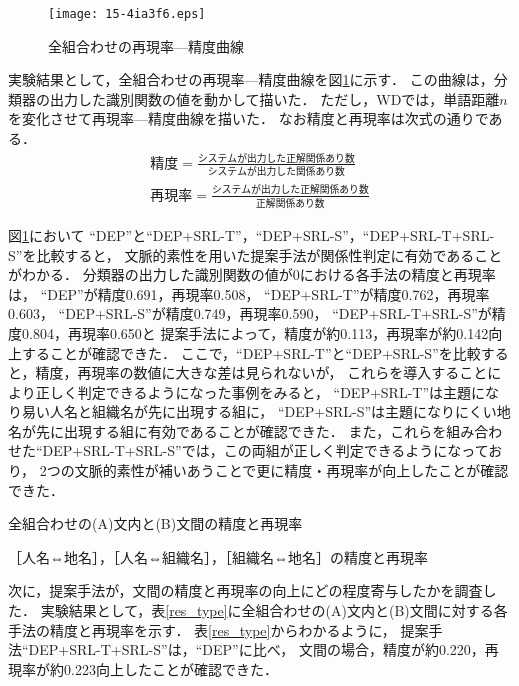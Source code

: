 \documentclass[japanese]{jnlp_1.4}
\begin{document}
\begin{figure}[t]
  \begin{center}
  \texttt{[image: 15-4ia3f6.eps]}
  \end{center}
  \caption{全組合わせの再現率—精度曲線}
  \label{rpc_all}
\end{figure}

実験結果として，全組合わせの再現率—精度曲線を図\ref{rpc_all}に示す．
この曲線は，分類器の出力した識別関数の値を動かして描いた．
ただし，WDでは，単語距離{$n$}を変化させて再現率—精度曲線を描いた．
なお精度と再現率は次式の通りである．
\vspace{0.5\baselineskip}
\begin{gather*}
 精度 = \frac{システムが出力した正解関係あり数}{システムが出力した関係あり数}\\[0.5zw]
 再現率 = \frac{システムが出力した正解関係あり数}{正解関係あり数}
\end{gather*}
\vspace{0.5\baselineskip}


図\ref{rpc_all}において
``DEP''と``DEP+SRL-T''，``DEP+SRL-S''，``DEP+SRL-T+SRL-S''を比較すると，
文脈的素性を用いた提案手法が関係性判定に有効であることがわかる．
分類器の出力した識別関数の値が0における各手法の精度と再現率は，
``DEP''が精度0.691，再現率0.508，
``DEP+SRL-T''が精度0.762，再現率0.603，
``DEP+SRL-S''が精度0.749，再現率0.590，
``DEP+SRL-T+SRL-S''が精度0.804，再現率0.650と
提案手法によって，精度が約0.113，再現率が約0.142向上することが確認できた．
ここで，``DEP+SRL-T''と``DEP+SRL-S''を比較すると，精度，再現率の数値に大きな差は見られないが，
これらを導入することにより正しく判定できるようになった事例をみると，
``DEP+SRL-T''は主題になり易い人名と組織名が先に出現する組に，
``DEP+SRL-S''は主題になりにくい地名が先に出現する組に有効であることが確認できた．
また，これらを組み合わせた``DEP+SRL-T+SRL-S''では，この両組が正しく判定できるようになっており，
2つの文脈的素性が補いあうことで更に精度・再現率が向上したことが確認できた．

\begin{table}[t]
\caption{全組合わせの(A)文内と(B)文間の精度と再現率}
\label{res_type}

\end{table}
\begin{table}[t]
\caption{［人名⇔地名］，［人名⇔組織名］，［組織名⇔地名］の精度と再現率}
\label{res_pare1}

\end{table}


次に，提案手法が，文間の精度と再現率の向上にどの程度寄与したかを調査した．
実験結果として，表\ref{res_type}に全組合わせの(A)文内と(B)文間に対する各手法の精度と再現率を示す．
表\ref{res_type}からわかるように，
提案手法``DEP+SRL-T+SRL-S''は，``DEP''に比べ，
文間の場合，精度が約0.220，再現率が約0.223向上したことが確認できた．
\end{document}
